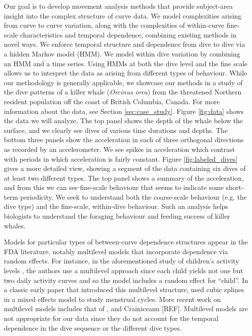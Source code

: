 Our goal is to develop movement analysis methods that provide subject-area insight  into the complex structure of curve data.
We model complexities arising from curve to curve variation, along with the complexities of within-curve fine-scale characteristics and temporal dependence,
combining existing methods in novel ways.
We enforce temporal structure and dependence from dive to dive via a hidden Markov model (HMM).
We model within dive variation by combining an HMM and a time series.
Using HMMs at both the dive level and the fine scale allows us to interpret the data as arising from different types of behaviour.
While our methodology is generally applicable, we  showcase our methods in a study of the dive patterns of a killer whale (\textit{Orcinus orca}) from the threatened Northern resident population off the coast of British Columbia, Canada.  
For more information about the data, see Section \ref{sec:case_study}.
Figure \ref{fig:data} shows the data we will analyze.
The top panel shows the depth of the whale below the surface, and we clearly see dives of various time durations and depths. 
The bottom three panels show the acceleration in each of three orthogonal directions as recorded by an accelerometer.   
We see spikes in acceleration which contrast with periods in which acceleration is fairly constant.
Figure {\ref{fig:labeled_dives}} gives a more detailed view, showing a segment of the data containing six dives of at least two different types.
The top panel shows a summary of the acceleration, and from this we can see fine-scale behaviour  that seems to indicate some  short-term periodicity. 
We seek to understand both the coarse-scale behaviour (e.g. the dive type) and the fine-scale, within-dive behaviour. 
Such an analysis helps biologists to understand the foraging behaviour and feeding success of killer whales. 

Models for particular types of between-curve dependence structures appear in the FDA literature, 
notably multilevel models that incorporate dependence via random effects.
For instance, in the aforementioned study of children's activity levels \citep{Morris:2007}, the authors use a multilevel approach since each child yields not one but two daily activity curves and so the model includes a random effect for ``child''.
In a classic early paper that introduced this multilevel structure,  \cite{Bromback:1998} used cubic splines in a mixed effects model to study menstrual cycles.  More recent work on multilevel models includes that of \cite{di:2009}, \cite{chen:2012} and Crainiceanu [REF]. 
Multilevel models are not appropriate for our data since they do not account for the temporal dependence in the dive sequence or the different dive types.

